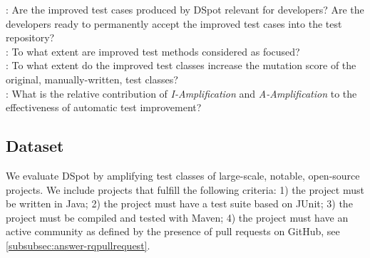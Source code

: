 \documentclass[table,xcdraw,smallextended]{svjour3}
\newcommand{\Iampl}{\emph{I-Amplification}\xspace}
\newcommand{\Aampl}{\emph{A-Amplification}\xspace}
\newcommand{\dspot}{DSpot\xspace}
\newcommand{\gh}{GitHub\xspace}
\newcommand{\ms}{mutation score\xspace}
\newcommand{\junit}{JUnit\xspace}
\begin{document}
\noindent\textbf{\rqpullrequest}: Are the improved test cases produced by \dspot relevant for developers? Are the developers ready to permanently accept the improved test cases into the test repository?\\
\textbf{\rqcandidates}: To what extent are improved test methods considered as focused?\\
\textbf{\rqeffectiveness}: To what extent do the improved test classes increase the \ms of the original,  manually-written, test classes?\\
\textbf{\rqAmplVersusIAmpl}: What is the relative contribution of \Iampl{} and \Aampl{} to the effectiveness of automatic test improvement?\\

\subsection{Dataset}
\label{subsec:dataset}

We evaluate \dspot by amplifying test classes of large-scale, notable, open-source projects. We include projects that fulfill the following criteria:  
1) the project must be written in Java; 
2) the project must have a test suite based on \junit;
3) the project must be compiled and tested with Maven;
4) the project must have an active community as defined by the presence of pull requests on \gh, see \autoref{subsubsec:answer-rqpullrequest}. 
\end{document}
